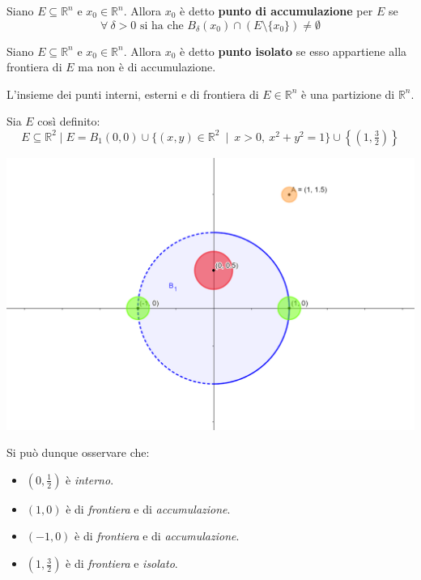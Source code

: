 \begin{definition}
    Siano $E \subseteq \mathbb{R}^n$ e $x_0 \in \mathbb{R}^n$. Allora $x_0$ è detto \textbf{punto di accumulazione} per $E$ se 
    \begin{equation}
        \forall \ \delta>0 \text{ si ha che } B_\delta(x_0) \cap \left(E \setminus \{x_0\}\right) \neq \emptyset
    \end{equation}
\end{definition}
\begin{definition}
    Siano $E \subseteq \mathbb{R}^n$ e $x_0 \in \mathbb{R}^n$. Allora $x_0$ è detto \textbf{punto isolato} se esso appartiene alla frontiera di $E$ ma non è di accumulazione.
\end{definition}
\begin{proposition}
    L'insieme dei punti interni, esterni e di frontiera di $E \in \mathbb{R}^n$ è una partizione di $\mathbb{R}^n$.
\end{proposition}
\begin{example}
    Sia $E$ così definito:
    \begin{equation*}
        E \subseteq \mathbb{R}^2 \mid E= B_1(0,0) \cup \{(x,y) \in \mathbb{R}^2\ \mid \ x>0, \ x^2+ y^2=1\} \cup \left\{\left(1,\tfrac{3}{2}\right)\right\}
    \end{equation*}
    \begin{minipage}{0.3\textwidth}
        \centering
        \includegraphics[width=\textwidth]{Capitoli/Capitolo2/Punti2.png}
    \end{minipage}
    \hfill
    \begin{minipage}{0.55\textwidth} 
        Si può dunque osservare che:
        \begin{itemize}
            \item $(0, \tfrac{1}{2})$ è \textit{interno}.
            \item $(1,0) $ è di \textit{frontiera} e di \textit{accumulazione}.
            \item $(-1,0) $ è di \textit{frontiera} e di \textit{accumulazione}.
            \item $\left(1, \tfrac{3}{2}\right) $ è di \textit{frontiera} e \textit{isolato}.
        \end{itemize}      
    \end{minipage}
\end{example}
